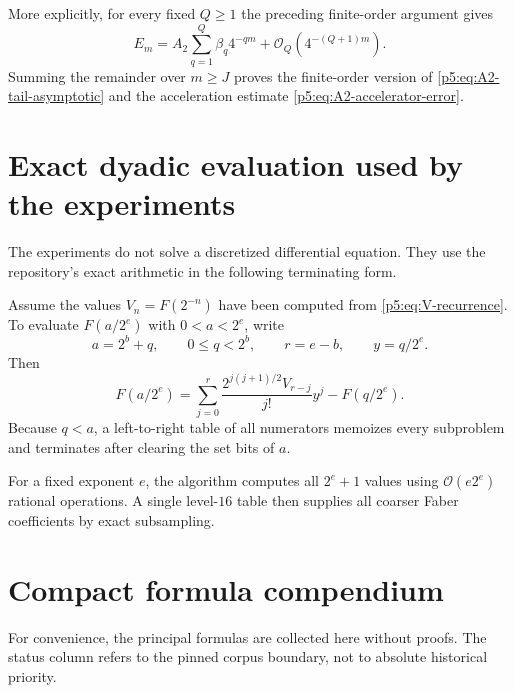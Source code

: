 \documentclass[11pt,oneside]{article}
\theoremstyle{definition}
\newcommand{\bigO}{\mathcal O}
\begin{document}
More explicitly, for every fixed $Q\ge1$ the preceding finite-order
argument gives
\begin{equation}
 E_m=A_2\sum_{q=1}^{Q}\beta_q4^{-qm}
 +\bigO_Q(4^{-(Q+1)m}).                                  \label{p5:eq:Em-finite-asymptotic}
\end{equation}
Summing the remainder over $m\ge J$ proves the finite-order version of
\eqref{p5:eq:A2-tail-asymptotic} and the acceleration estimate
\eqref{p5:eq:A2-accelerator-error}.

\section{Exact dyadic evaluation used by the experiments}
\label{p5:app:dyadic-algorithm}

The experiments do not solve a discretized differential equation.  They use
the repository's exact arithmetic in the following terminating form.

\begin{algorithm}
\label{p5:alg:highest-bit}
Assume the values $V_n=F(2^{-n})$ have been computed from
\eqref{p5:eq:V-recurrence}.  To evaluate $F(a/2^e)$ with
$0<a<2^e$, write
\begin{equation}
 a=2^b+q,
 \qquad 0\le q<2^b,
 \qquad r=e-b,
 \qquad y=q/2^e.                                        \label{p5:eq:bit-decomposition}
\end{equation}
Then
\begin{equation}
 \boxed{\displaystyle
 F(a/2^e)=
 \sum_{j=0}^{r}
 \frac{2^{j(j+1)/2}V_{r-j}}{j!}y^j-F(q/2^e).}           \label{p5:eq:highest-bit-evaluator}
\end{equation}
Because $q<a$, a left-to-right table of all numerators memoizes every
subproblem and terminates after clearing the set bits of $a$.
\end{algorithm}

For a fixed exponent $e$, the algorithm computes all $2^e+1$ values using
$\bigO(e2^e)$ rational operations.  A single level-$16$ table then supplies
all coarser Faber coefficients by exact subsampling.

\section{Compact formula compendium}
\label{p5:app:compendium}

For convenience, the principal formulas are collected here without proofs.
The status column refers to the pinned corpus boundary, not to absolute
historical priority.
\end{document}
